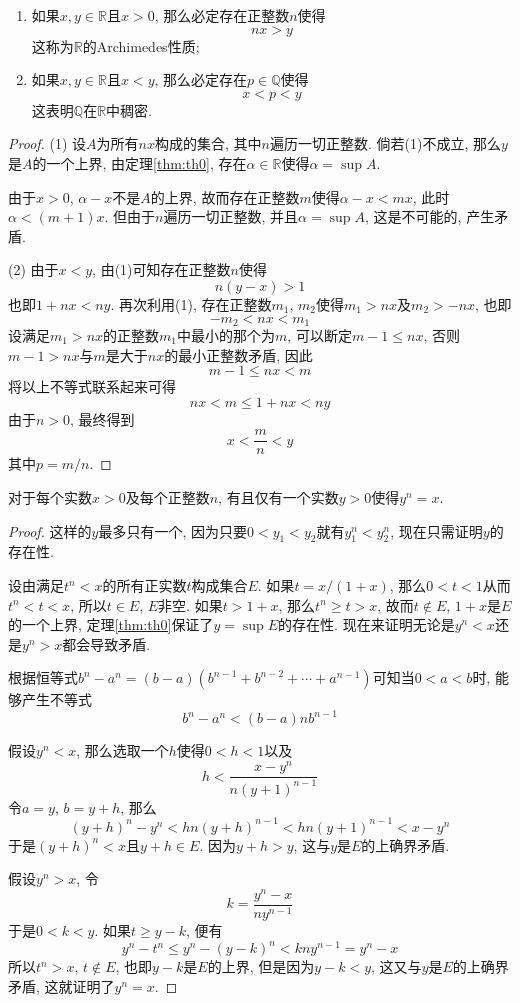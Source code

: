\documentclass[cn,12pt,math=mtpro2,citestyle=gb7714-2015,bibstyle=gb7714-2015,twocol]{elegantbook}
\newcommand{\R}{\mathbb{R}}
\newcommand{\Q}{\mathbb{Q}}
\begin{document}
\begin{theorem}
\begin{enumerate}[label=(\arabic*)]
  \item 如果$x, y\in \R$且$x>0$, 那么必定存在正整数$n$使得
  $$nx>y$$
  这称为$\R$的Archimedes性质;
  \item 如果$x, y\in \R$且$x<y$, 那么必定存在$p\in \Q$使得
  $$x<p<y$$
  这表明$\Q$在$\R$中稠密.
\end{enumerate}
\end{theorem}

\begin{proof}
  (1) 设$A$为所有$nx$构成的集合, 其中$n$遍历一切正整数. 倘若(1)不成立, 那么$y$是$A$的一个上界, 由定理\ref{thm:th0}, 存在$\alpha\in\R$使得$\alpha=\sup A$.

  由于$x>0$, $\alpha-x$不是$A$的上界, 故而存在正整数$m$使得$\alpha-x<mx$, 此时$\alpha<(m+1)x$. 但由于$n$遍历一切正整数, 并且$\alpha=\sup A$, 这是不可能的, 产生矛盾.

  (2) 由于$x<y$, 由(1)可知存在正整数$n$使得
  $$n(y-x)>1$$
  也即$1+nx<ny$. 再次利用(1), 存在正整数$m_1$, $m_2$使得$m_1>nx$及$m_2>-nx$, 也即
  $$-m_2<nx<m_1$$
  设满足$m_1>nx$的正整数$m_1$中最小的那个为$m$, 可以断定$m-1\leq nx$, 否则$m-1>nx$与$m$是大于$nx$的最小正整数矛盾, 因此
  $$m-1\leq nx<m$$
  将以上不等式联系起来可得
  $$nx<m \leq 1+nx < ny$$
  由于$n>0$, 最终得到
  $$x<\frac{m}{n}<y$$
  其中$p=m/n$.

\end{proof}
\begin{theorem}\label{thm:thm1.1}
  对于每个实数$x>0$及每个正整数$n$, 有且仅有一个实数$y>0$使得$y^n=x$.
\end{theorem}
\begin{proof}
  这样的$y$最多只有一个, 因为只要$0<y_1<y_2$就有$y_1^n<y_2^n$, 现在只需证明$y$的存在性.

  设由满足$t^n<x$的所有正实数$t$构成集合$E$. 如果$t=x/(1+x)$, 那么$0<t<1$从而$t^n<t<x$, 所以$t\in E$, $E$非空. 如果$t>1+x$, 那么$t^n\geq t>x$, 故而$t\notin E$, $1+x$是$E$的一个上界, 定理\ref{thm:th0}保证了$y=\sup E$的存在性. 现在来证明无论是$y^n<x$还是$y^n>x$都会导致矛盾.

  根据恒等式$b^n-a^n=(b-a)(b^{n-1}+b^{n-2}+\cdots+a^{n-1})$可知当$0<a<b$时, 能够产生不等式
  $$b^n-a^n<(b-a)nb^{n-1}$$

  假设$y^n<x$, 那么选取一个$h$使得$0<h<1$以及
  $$h<\frac{x-y^n}{n(y+1)^{n-1}}$$
  令$a=y$, $b=y+h$, 那么
  $$(y+h)^n-y^n<hn(y+h)^{n-1}<hn(y+1)^{n-1}<x-y^n$$
  于是$(y+h)^n<x$且$y+h\in E$. 因为$y+h>y$, 这与$y$是$E$的上确界矛盾.

  假设$y^n>x$, 令
  $$k=\frac{y^n-x}{ny^{n-1}}$$
  于是$0<k<y$. 如果$t\geq y-k$, 便有
  $$y^n-t^n\leq y^n-(y-k)^n<kny^{n-1}=y^n-x$$
  所以$t^n>x$, $t\notin E$, 也即$y-k$是$E$的上界, 但是因为$y-k<y$, 这又与$y$是$E$的上确界矛盾, 这就证明了$y^n=x$.
\end{proof}
\end{document}
